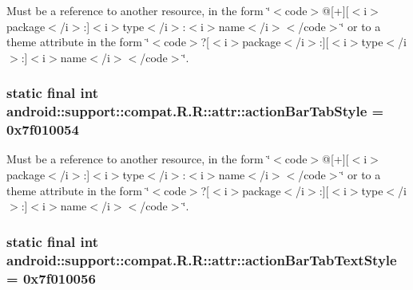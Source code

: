 Must be a reference to another resource, in the form \char`\"{}$<$code$>$@\mbox{[}+\mbox{]}\mbox{[}$<$i$>$package$<$/i$>$:\mbox{]}$<$i$>$type$<$/i$>$:$<$i$>$name$<$/i$>$$<$/code$>$\char`\"{} or to a theme attribute in the form \char`\"{}$<$code$>$?\mbox{[}$<$i$>$package$<$/i$>$:\mbox{]}\mbox{[}$<$i$>$type$<$/i$>$:\mbox{]}$<$i$>$name$<$/i$>$$<$/code$>$\char`\"{}. \hypertarget{classandroid_1_1support_1_1compat_1_1_r_1_1attr_ec00d2c1e26563a4cdae1b355d2ce253}{
\subsubsection[{actionBarTabStyle}]{\setlength{\rightskip}{0pt plus 5cm}static final int android::support::compat.R.R::attr::actionBarTabStyle = 0x7f010054}}
\label{classandroid_1_1support_1_1compat_1_1_r_1_1attr_ec00d2c1e26563a4cdae1b355d2ce253}


Must be a reference to another resource, in the form \char`\"{}$<$code$>$@\mbox{[}+\mbox{]}\mbox{[}$<$i$>$package$<$/i$>$:\mbox{]}$<$i$>$type$<$/i$>$:$<$i$>$name$<$/i$>$$<$/code$>$\char`\"{} or to a theme attribute in the form \char`\"{}$<$code$>$?\mbox{[}$<$i$>$package$<$/i$>$:\mbox{]}\mbox{[}$<$i$>$type$<$/i$>$:\mbox{]}$<$i$>$name$<$/i$>$$<$/code$>$\char`\"{}. \hypertarget{classandroid_1_1support_1_1compat_1_1_r_1_1attr_78a14f39a7d5aa3f5c67587cbae8f740}{
\subsubsection[{actionBarTabTextStyle}]{\setlength{\rightskip}{0pt plus 5cm}static final int android::support::compat.R.R::attr::actionBarTabTextStyle = 0x7f010056}}
\label{classandroid_1_1support_1_1compat_1_1_r_1_1attr_78a14f39a7d5aa3f5c67587cbae8f740}


